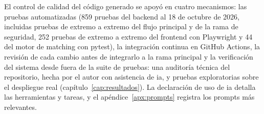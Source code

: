 El control de calidad del código generado se apoyó en cuatro
mecanismos: las pruebas automatizadas (859 pruebas del backend al 18 de
octubre de 2026, incluidas pruebas de extremo a extremo del flujo
principal y de la rama de seguridad, 252 pruebas de extremo a extremo
del frontend con Playwright y 44 del motor de \gls{matching} con
pytest), la integración continua en GitHub Actions, la revisión de
cada cambio antes de integrarlo a la rama principal y la verificación
del sistema desde fuera de la suite de pruebas: una auditoría técnica
del repositorio, hecha por el autor con asistencia de \gls{ia}, y
pruebas exploratorias sobre el despliegue real
(capítulo~\ref{cap:resultados}). La declaración de uso de \gls{ia}
detalla las herramientas y tareas, y el apéndice~\ref{apx:prompts}
registra los prompts más relevantes.
